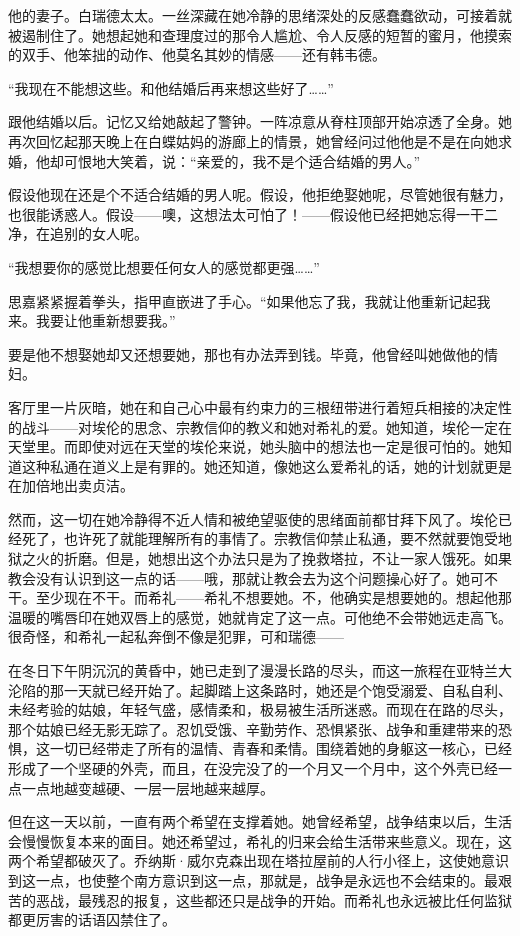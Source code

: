 \par 他的妻子。白瑞德太太。一丝深藏在她冷静的思绪深处的反感蠢蠢欲动，可接着就被遏制住了。她想起她和查理度过的那令人尴尬、令人反感的短暂的蜜月，他摸索的双手、他笨拙的动作、他莫名其妙的情感——还有韩韦德。
\par “我现在不能想这些。和他结婚后再来想这些好了……”
\par 跟他结婚以后。记忆又给她敲起了警钟。一阵凉意从脊柱顶部开始凉透了全身。她再次回忆起那天晚上在白蝶姑妈的游廊上的情景，她曾经问过他他是不是在向她求婚，他却可恨地大笑着，说：“亲爱的，我不是个适合结婚的男人。”
\par 假设他现在还是个不适合结婚的男人呢。假设，他拒绝娶她呢，尽管她很有魅力，也很能诱惑人。假设——噢，这想法太可怕了！——假设他已经把她忘得一干二净，在追别的女人呢。
\par “我想要你的感觉比想要任何女人的感觉都更强……”
\par 思嘉紧紧握着拳头，指甲直嵌进了手心。“如果他忘了我，我就让他重新记起我来。我要让他重新想要我。”
\par 要是他不想娶她却又还想要她，那也有办法弄到钱。毕竟，他曾经叫她做他的情妇。
\par 客厅里一片灰暗，她在和自己心中最有约束力的三根纽带进行着短兵相接的决定性的战斗——对埃伦的思念、宗教信仰的教义和她对希礼的爱。她知道，埃伦一定在天堂里。而即使对远在天堂的埃伦来说，她头脑中的想法也一定是很可怕的。她知道这种私通在道义上是有罪的。她还知道，像她这么爱希礼的话，她的计划就更是在加倍地出卖贞洁。
\par 然而，这一切在她冷静得不近人情和被绝望驱使的思绪面前都甘拜下风了。埃伦已经死了，也许死了就能理解所有的事情了。宗教信仰禁止私通，要不然就要饱受地狱之火的折磨。但是，她想出这个办法只是为了挽救塔拉，不让一家人饿死。如果教会没有认识到这一点的话——哦，那就让教会去为这个问题操心好了。她可不干。至少现在不干。而希礼——希礼不想要她。不，他确实是想要她的。想起他那温暖的嘴唇印在她双唇上的感觉，她就肯定了这一点。可他绝不会带她远走高飞。很奇怪，和希礼一起私奔倒不像是犯罪，可和瑞德——
\par 在冬日下午阴沉沉的黄昏中，她已走到了漫漫长路的尽头，而这一旅程在亚特兰大沦陷的那一天就已经开始了。起脚踏上这条路时，她还是个饱受溺爱、自私自利、未经考验的姑娘，年轻气盛，感情柔和，极易被生活所迷惑。而现在在路的尽头，那个姑娘已经无影无踪了。忍饥受饿、辛勤劳作、恐惧紧张、战争和重建带来的恐惧，这一切已经带走了所有的温情、青春和柔情。围绕着她的身躯这一核心，已经形成了一个坚硬的外壳，而且，在没完没了的一个月又一个月中，这个外壳已经一点一点地越变越硬、一层一层地越来越厚。
\par 但在这一天以前，一直有两个希望在支撑着她。她曾经希望，战争结束以后，生活会慢慢恢复本来的面目。她还希望过，希礼的归来会给生活带来些意义。现在，这两个希望都破灭了。乔纳斯·威尔克森出现在塔拉屋前的人行小径上，这使她意识到这一点，也使整个南方意识到这一点，那就是，战争是永远也不会结束的。最艰苦的恶战，最残忍的报复，这些都还只是战争的开始。而希礼也永远被比任何监狱都更厉害的话语囚禁住了。
